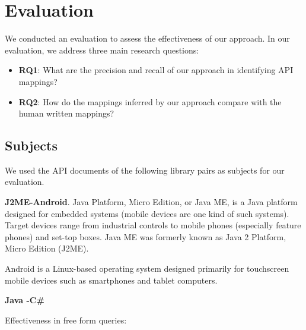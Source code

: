 \section{Evaluation}
\label{sec:evaluation}

We conducted an evaluation to assess the effectiveness of our approach. In our evaluation, we address three main research questions:

\begin{itemize}
	
\item\textbf{RQ1}: What are the precision and recall of our approach in identifying API mappings?

\item\textbf{RQ2}: How do the mappings inferred by our approach compare with the human written mappings?

\end{itemize}

\subsection{Subjects}
\label{sub:subject}

We used the API documents of the following library pairs as subjects for our evaluation. 


\textbf{J2ME-Android}. Java Platform, Micro Edition, or Java ME, is a Java platform designed for embedded systems (mobile devices are one kind of such systems). Target devices range from industrial controls to mobile phones (especially feature phones) and set-top boxes. Java ME was formerly known as Java 2 Platform, Micro Edition (J2ME).

Android is a Linux-based operating system designed primarily for touchscreen mobile devices such as smartphones and tablet computers.

\textbf{Java -C\#}




Effectiveness in free form queries:

